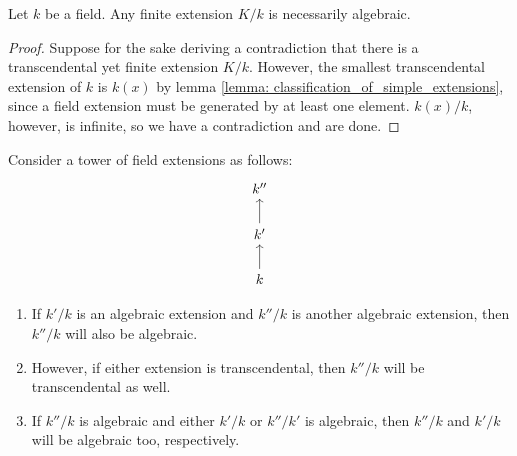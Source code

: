         \begin{corollary} \label{coro: finite_extensions_are_algebraic}
            Let $k$ be a field. Any finite extension $K/k$ is necessarily algebraic.
        \end{corollary}
            \begin{proof}
                Suppose for the sake deriving a contradiction that there is a transcendental yet finite extension $K/k$. However, the smallest transcendental extension of $k$ is $k(x)$ by lemma \ref{lemma: classification_of_simple_extensions}, since a field extension must be generated by at least one element. $k(x)/k$, however, is infinite, so we have a contradiction and are done. 
            \end{proof}

        \begin{lemma} \label{lemma: towers_of_algebraic_extensions}
            Consider a tower of field extensions as follows:
                $$
                    \begin{tikzcd}
                        {k''} \\
                        {k'} \\
                        k
                        \arrow[from=2-1, to=1-1]
                        \arrow[from=3-1, to=2-1]
                    \end{tikzcd}
                $$
            \begin{enumerate}
                \item If $k'/k$ is an algebraic extension and $k''/k$ is another algebraic extension, then $k''/k$ will also be algebraic.
                \item However, if either extension is transcendental, then $k''/k$ will be transcendental as well.
                \item If $k''/k$ is algebraic and either $k'/k$ or $k''/k'$ is algebraic, then $k''/k$ and $k'/k$ will be algebraic too, respectively. 
            \end{enumerate}
        \end{lemma}
